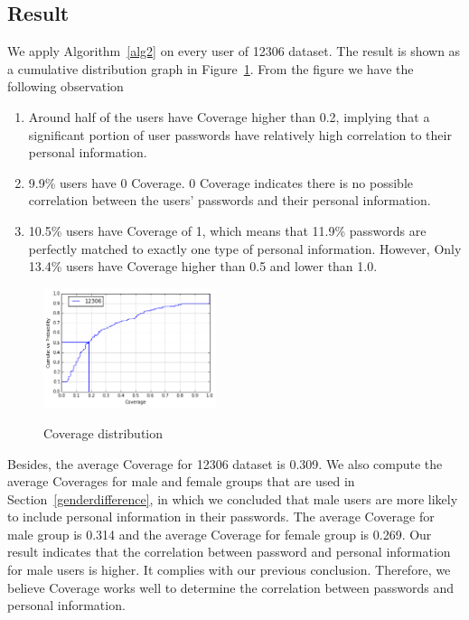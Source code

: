 \documentclass{sig-alternate}
\begin{document}
\subsection{Result}
We apply Algorithm~\ref{alg2} on every user of 12306 dataset. The result is shown as a cumulative distribution graph in Figure~\ref{f2}. From the figure we have the following observation
\begin{enumerate}[leftmargin=*]
\item Around half of the users have Coverage higher than 0.2, implying that  a significant portion of user passwords have relatively high correlation to their personal information.
\item 9.9\% users have 0 Coverage. 0 Coverage indicates there is no possible correlation between the users' passwords and their personal information.
\item 10.5\% users have Coverage of 1, which means that 11.9\% passwords are perfectly matched to exactly one type of personal information. However, Only 13.4\% users have Coverage higher than 0.5 and lower than 1.0. 
\end{enumerate}

\begin{figure}[h!]
\centering
  \caption{Coverage distribution}{}
  \label{f2}
  \centering
    \includegraphics[width=0.45\textwidth]{fig/cvghist}
\end{figure}

Besides, the average Coverage for 12306 dataset is 0.309. We also compute the average Coverages for male and female groups that are used in Section~\ref{genderdifference}, in which we concluded that male users are more likely to include personal information in their passwords. The average Coverage for male group is 0.314 and the average Coverage for female group is 0.269. Our result indicates that the correlation between password and personal information for male users is higher. It complies with our previous conclusion. Therefore, we believe Coverage works well to determine the correlation between passwords and personal information.
\end{document}
